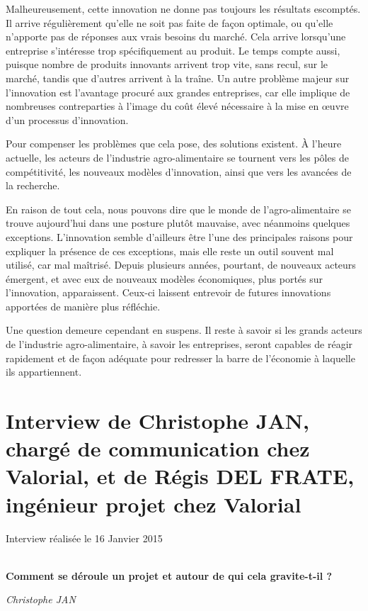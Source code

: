 \documentclass[a4paper,12pt]{report}
\begin{document}
    Malheureusement, cette innovation ne donne pas toujours les résultats escomptés. Il arrive régulièrement qu’elle ne soit pas faite de façon optimale, ou qu’elle n’apporte pas de réponses aux vrais besoins du marché. Cela arrive lorsqu’une entreprise s’intéresse trop spécifiquement au produit. Le temps compte aussi, puisque nombre de produits innovants arrivent trop vite, sans recul, sur le marché, tandis que d’autres arrivent à la traîne. Un autre problème majeur sur l’innovation est l’avantage procuré aux grandes entreprises, car elle implique de nombreuses contreparties à l’image du coût élevé nécessaire à la mise en œuvre d’un processus d’innovation.
    
    Pour compenser les problèmes que cela pose, des solutions existent. À l’heure actuelle, les acteurs de l’industrie agro-alimentaire se tournent vers les pôles de compétitivité, les nouveaux modèles d’innovation, ainsi que vers les avancées de la recherche.
    
    En raison de tout cela, nous pouvons dire que le monde de l'agro-alimentaire se trouve aujourd'hui dans une posture plutôt mauvaise, avec néanmoins quelques exceptions. L'innovation semble d'ailleurs être l'une des principales raisons pour expliquer la présence de ces exceptions, mais elle reste un outil souvent mal utilisé, car mal maîtrisé. Depuis plusieurs années, pourtant, de nouveaux acteurs émergent, et avec eux de nouveaux modèles économiques, plus portés sur l'innovation, apparaissent. Ceux-ci laissent entrevoir de futures innovations apportées de manière plus réfléchie.
    
    Une question demeure cependant en suspens. Il reste à savoir si les grands acteurs de l'industrie agro-alimentaire, à savoir les entreprises, seront capables de réagir rapidement et de façon adéquate pour redresser la barre de l'économie à laquelle ils appartiennent.

\appendix
\chapter{Interview de Christophe JAN, chargé de communication chez Valorial, et de Régis DEL FRATE, ingénieur projet chez Valorial}
\label{Interview}

	Interview réalisée le 16 Janvier 2015

	\textbf{\\Comment se déroule un projet et autour de qui cela gravite-t-il ?}

	\emph{Christophe JAN}
\end{document}
